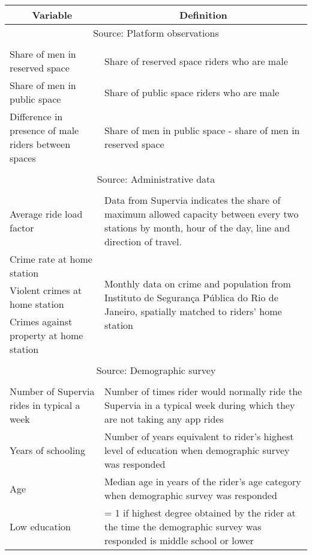 \begin{table}[H]
    \centering
    \singlespacing
    \footnotesize
    \begin{tabular}{p{.4\linewidth}p{.6\linewidth}}
    \hline\hline 
        \multicolumn{1}{c}{\textbf{Variable}}	&	\multicolumn{1}{c}{\textbf{Definition}}	\\ 
    \hline 
    \multicolumn{2}{c}{Source: Platform observations} \\
    \hline\\[-1.8ex]
Share of men in reserved space	& Share of reserved space riders who are male		\\
Share of men in public space	& Share of public space riders who are male		\\
Difference in presence of male riders between spaces	&	Share of men in public space - share of men in reserved space	\\\\[-1.8ex]
\hline
\multicolumn{2}{c}{Source: Administrative data} \\
\hline\\[-1.8ex]
Average ride load factor	& Data from Supervia indicates the share of maximum allowed capacity between every two stations by month, hour of the day, line and direction of travel. 		\\
Crime rate at home station	& \multirow{3}{*}{\parbox{\linewidth}{Monthly data on crime and population from Instituto de Segurança Pública do Rio de Janeiro, spatially matched to riders' home station}} 	\\
Violent crimes at home station	&		\\
Crimes against property at home station	&		\\\\[-1.8ex]
\hline
\multicolumn{2}{c}{Source: Demographic survey} \\
\hline\\[-1.8ex]
Number of Supervia rides in typical a week	& Number of times rider would normally ride the Supervia in a typical week during which they are not taking any app rides	\\
Years of schooling	&	Number of years equivalent to rider's highest level of education when demographic survey was responded	\\
Age	&	Median age in years of the rider's age category when demographic survey was responded	\\
Low education	&	= 1 if highest degree obtained by the rider at the time the demographic survey was responded is middle school or lower	\\

\end{tabular}
\end{table}
